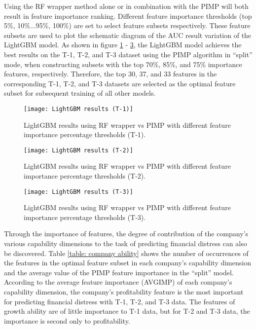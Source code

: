 \documentclass[review]{elsarticle}
\begin{document}
Using the RF wrapper method alone or in combination with the PIMP will both result in feature importance ranking. Different feature importance thresholds (top 5\%, 10\%...95\%, 100\%) are set to select feature subsets respectively. These feature subsets are used to plot the schematic diagram of the AUC result variation of the LightGBM model. As shown in figure \ref{fig: RF wrapper vs PIMP 1} - \ref{fig: RF wrapper vs PIMP 3}, the LightGBM model achieves the best results on the T-1, T-2, and T-3 dataset using the PIMP algorithm in ``split'' mode, when constructing subsets with the top 70\%, 85\%, and 75\% importance features, respectively. Therefore, the top 30, 37, and 33 features in the corresponding T-1, T-2, and T-3 datasets are selected as the optimal feature subset for subsequent training of all other models.

\begin{figure}[H]
    \centering
    \texttt{[image: LightGBM results (T-1)]}
    \caption{LightGBM results using RF wrapper vs PIMP with different feature importance percentage thresholds (T-1).}
    \label{fig: RF wrapper vs PIMP 1}
\end{figure}

\begin{figure}[H]
    \centering
    \texttt{[image: LightGBM results (T-2)]}
    \caption{LightGBM results using RF wrapper vs PIMP with different feature importance percentage thresholds (T-2).}
    \label{fig: RF wrapper vs PIMP 2}
\end{figure}

\begin{figure}[H]
    \centering
    \texttt{[image: LightGBM results (T-3)]}
    \caption{LightGBM results using RF wrapper vs PIMP with different feature importance percentage thresholds (T-3).}
    \label{fig: RF wrapper vs PIMP 3}
\end{figure}

Through the importance of features, the degree of contribution of the company's various capability dimensions to the task of predicting financial distress can also be discovered. Table \ref{table: company ability} shows the number of occurrences of the features in the optimal feature subset in each company's capability dimension and the average value of the PIMP feature importance in the ``split'' model. According to the average feature importance (AVGIMP) of each company's capability dimension, the company's profitability feature is the most important for predicting financial distress with T-1, T-2, and T-3 data. The features of growth ability are of little importance to T-1 data, but for T-2 and T-3 data, the importance is second only to profitability.
\end{document}
